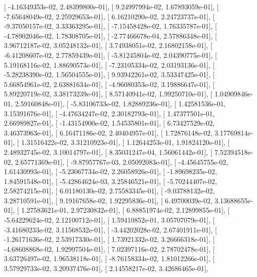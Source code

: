 \documentclass{article}
\begin{document}
       [ -4.16349353e-02,   2.48399800e-01],
       [  9.24997994e-02,   1.67893059e-01],
       [ -7.65648049e-02,   2.25929653e-01],
       [  6.16210290e-02,   2.24723737e-01],
       [ -9.37050157e-02,   3.33363295e-01],
       [ -7.15458428e-02,   1.76335787e-01],
       [ -4.78902046e-02,   1.78308705e-01],
       [ -2.77466678e-04,   2.57886348e-01],
       [  3.96712187e-02,   3.05248132e-01],
       [  3.74938051e-02,   2.16802158e-01],
       [ -6.41208607e-02,   2.77859439e-01],
       [ -5.81245804e-02,   2.04390775e-01],
       [  5.19168116e-02,   1.88690573e-01],
       [ -7.23105334e-02,   2.03193136e-01],
       [ -5.28238390e-02,   1.56504555e-01],
       [  9.93942261e-02,   3.53347425e-01],
       [  5.66854961e-02,   2.63881634e-01],
       [ -4.96080353e-02,   3.19886647e-01],
       [  5.89220719e-02,   3.38173239e-01],
       [  8.57140941e-02,   1.99250710e-01],
       [  1.04909846e-01,   2.59160848e-01],
       [ -5.83106733e-02,   1.82889236e-01],
       [  1.42581536e-01,   3.15391676e-01],
       [ -4.47634247e-02,   2.30182793e-01],
       [  1.47377501e-01,   2.66989827e-01],
       [ -1.43154900e-02,   1.54535801e-01],
       [  6.73427529e-02,   3.46373963e-01],
       [  6.16471186e-02,   2.40404957e-01],
       [  1.72876148e-02,   3.17769814e-01],
       [  1.31516422e-02,   3.31210923e-01],
       [  1.12644253e-01,   1.91824120e-01],
       [  2.48932745e-02,   3.10014797e-01],
       [  8.35031247e-04,   1.56061442e-01],
       [  7.52394518e-02,   2.65771369e-01],
       [ -9.87957767e-03,   2.05092083e-01],
       [ -4.45645755e-02,   1.61430993e-01],
       [ -5.23067734e-02,   2.26058926e-01],
       [ -1.89698235e-02,   1.84591548e-01],
       [ -5.42864624e-03,   3.25846521e-01],
       [ -5.70244407e-02,   2.58274215e-01],
       [  6.01180130e-02,   2.75583345e-01],
       [ -9.03788132e-02,   3.28710591e-01],
       [  9.19167658e-02,   1.92295836e-01],
       [  6.49700039e-02,   3.13688655e-01],
       [  1.27583621e-01,   2.97230832e-01],
       [  6.88851974e-02,   2.12899855e-01],
       [ -5.64229624e-02,   2.12100712e-01],
       [  1.59410852e-01,   3.05707079e-01],
       [ -3.41680233e-02,   3.11568532e-01],
       [ -3.44202028e-02,   2.67401911e-01],
       [ -1.26171636e-02,   2.53917330e-01],
       [  1.73921332e-02,   3.26666318e-01],
       [ -4.68608868e-02,   1.92997504e-01],
       [  7.02397116e-02,   2.78702478e-01],
       [  3.63726497e-02,   1.96538118e-01],
       [ -8.76158334e-02,   1.81012266e-01],
       [  3.57929733e-02,   3.20937476e-01],
       [  2.14558217e-02,   3.42686465e-01],
\end{document}
